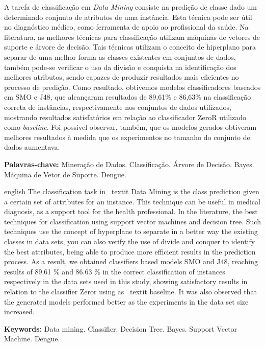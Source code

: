 \documentclass[
	12pt,				%
	openright,			%
	oneside,	
	a4paper,				%
	english,				%
	brazil				%
]{abntex2/abntex2} %
\begin{document}
\setlength{\absparsep}{18pt} %
\begin{resumo}

 	A tarefa de classificação em \textit{Data Mining} consiste na predição de classe dado um determinado conjunto de atributos de uma instância. Esta técnica pode ser útil no diagnóstico médico, como ferramenta de apoio ao profissional da saúde. Na literatura, as melhores técnicas para classificação utilizam máquinas de vetores de suporte e árvore de decisão. Tais técnicas utilizam o conceito de hiperplano para separar de uma melhor forma as classes existentes em conjuntos de dados, também pode-se verificar o uso da divisão e conquista na identificação dos melhores atributos, sendo capazes de produzir resultados mais eficientes no processo de predição. Como resultado, obtivemos modelos classificadores baseados em SMO e J48, que alcançaram resultados de 89,61\% e 86,63\% na classificação correta de instâncias, respectivamente nos conjuntos de dados utilizados, mostrando resultados satisfatórios em relação ao classificador ZeroR utilizado como \textit{baseline}. Foi possível observar, também, que os modelos gerados obtiveram melhores resultados à medida que os experimentos no tamanho do conjunto de dados aumentava.

 \textbf{Palavras-chave:} Mineração de Dados. Classificação. Árvore de Decisão. Bayes. Máquina de Vetor de Suporte. Dengue.

\end{resumo}


\begin{resumo}[ABSTRACT]
 \begin{otherlanguage*}{english}
   The classification task in \ textit {Data Mining} is the class prediction given a certain set of attributes for an instance. This technique can be useful in medical diagnosis, as a support tool for the health professional. In the literature, the best techniques for classification using support vector machines and decision tree. Such techniques use the concept of hyperplane to separate in a better way the existing classes in data sets, you can also verify the use of divide and conquer to identify the best attributes, being able to produce more efficient results in the prediction process. As a result, we obtained classifiers based models SMO and J48, reaching results of 89.61 \% and 86.63 \% in the correct classification of instances respectively in the data sets used in this study, showing satisfactory results in relation to the classifier Zeror using as \ textit {baseline}. It was also observed that the generated models performed better as the experiments in the data set size increased.

   \vspace{\onelineskip}
 
   \noindent 
   \textbf{Keywords:} Data mining. Classifier. Decision Tree. Bayes. Support Vector Machine. Dengue.
 \end{otherlanguage*}
\end{resumo}
\end{document}
